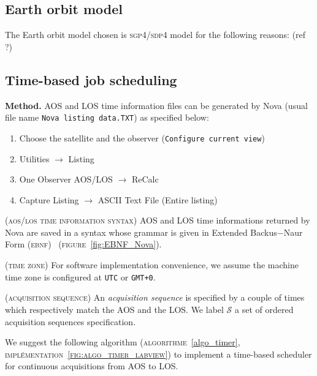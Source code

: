 \documentclass[twocolumn,pre,floats,aps,amsmath,amssymb]{revtex4}
\newenvironment{definition}[1][D\'efinition.]{\begin{trivlist}
\item[\hskip \labelsep {\bfseries #1}]}{\end{trivlist}}
\newenvironment{remark}[1][Remarque.]{\begin{trivlist}
\item[\hskip \labelsep {\bfseries #1}]}{\end{trivlist}}
\begin{document}
\subsection {Earth orbit model}

The Earth orbit model chosen is \textsc{sgp4/sdp4} model for the following reasons: (ref ?)

\subsection {Time-based job scheduling}

\textbf{Method.}
AOS and LOS time information files can be generated by Nova (usual file name \texttt{Nova listing data.TXT}) as specified below:
\begin{enumerate}
\item {Choose the satellite and the observer (\texttt{Configure current view})}
\item {\textup{Utilities} $\rightarrow$ \textup{Listing}}
\item {\textup{One Observer AOS/LOS} $\rightarrow$ \textup{ReCalc}}
\item {\textup{Capture Listing} $\rightarrow$ \textup{ASCII Text File} (Entire listing)}
\end{enumerate}

\begin{remark}
  { \color{rltred}{\Radioactivity} }
  \textsc{(aos/los time information syntax)}
  AOS and LOS time informations returned by Nova are saved in a syntax whose grammar is given in Extended Backus$-$Naur Form (\textsc{ebnf})~\cite{EBNF} (\textsc{figure}~\ref{fig:EBNF_Nova}).
\end{remark}

\begin{remark}
  \textsc{(time zone)}
  For software implementation convenience, we assume the machine time zone is configured at \texttt{UTC} or \texttt{GMT+0}.
\end{remark}

\begin{definition}
  { \color{rltred}{\Radioactivity} }
  \textsc{(acquisition sequence)}
  An \textit{acquisition sequence} is specified by a couple of times which respectively match the AOS and the LOS. We label $\mathcal{S}$ a set of ordered acquisition sequences specification.
\end{definition}

We suggest the following algorithm (\textsc{algorithme}~\ref{algo_timer}, \textsc{impl\'ementation~\ref{fig:algo_timer_labview}}) to implement a time-based scheduler for continuous acquisitions from AOS to LOS.
\end{document}
